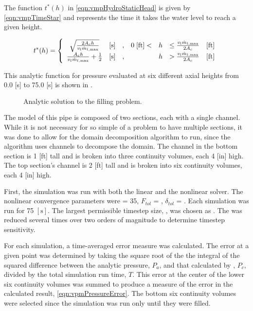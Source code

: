 The function $t^{*}(h)$ in \eqref{eqn:vmpHydroStaticHead} is given by \eqref{eqn:vmpTimeStar} and represents the time it takes the water level to reach a given height.

\begin{equation}
\label{eqn:vmpTimeStar}
t^{*}(h)= 
 \left\{
\begin{array}{cclrcll}
\sqrt{\frac{2 A_c h}{v_{l} \dot{m}_{l,\text{max}}}} & [ \text{s} ] & , & 0\; [ \text{ft}] < & h & \leq \frac{v_l \dot{m}_{l,\text{max}}}{2 A_c} & [\text{ft}] \\
\frac{ A_c h }{v_{l} \dot{m}_{l,\text{max}}} + \onehalf & [ \text{s} ] & , &                & h & > \frac{v_l \dot{m}_{l,\text{max}}}{2 A_c} & [\text{ft}]
\end{array}\right.
\end{equation}

This analytic function for pressure evaluated at six different axial heights from 0.0 [s] to 75.0 [s] is shown in .

\begin{figure}[h!tb]
\centering

\caption{Analytic solution to the filling problem.}
\label{fig:vmpAnalyticSol}
\end{figure}

The \cobra{} model of this pipe is composed of two sections, each with a single channel.
While it is not necessary for so simple of a problem to have multiple sections, it was done to allow for the domain decomposition algorithm to run, since the algorithm uses channels to decompose the domain.
The channel in the bottom section is 1 [ft] tall and is broken into three continuity volumes, each 4 [in] high.
The top section's channel is 2 [ft] tall and is broken into six continuity volumes, each 4 [in] high.

First, the simulation was run with both the linear and the nonlinear solver.
The nonlinear convergence parameters were \kmax{} = 35, $F_{tol}$ = , $\delta_{tol}$ = . 
Each simulation was run for 75 $[ \text{s} ]$.
The largest permissible timestep size, \dtmax{}, was chosen as .
The \dtmax{} was reduced several times over two orders of magnitude to determine timestep sensitivity.

For each simulation, a time-averaged error measure was calculated.
The error at a given point was determined by taking the square root of the the integral of the squared difference between the analytic pressure, $P_{a}$, and that calculated by \cobra{}, $P_{c}$, divided by the total simulation run time, $T$.
This error at the center of the lower six continuity volumes was summed to produce a measure of the error in the calculated result, \eqref{eqn:vpmPressureError}.
The bottom six continuity volumes were selected since the simulation was run only until they were filled.

